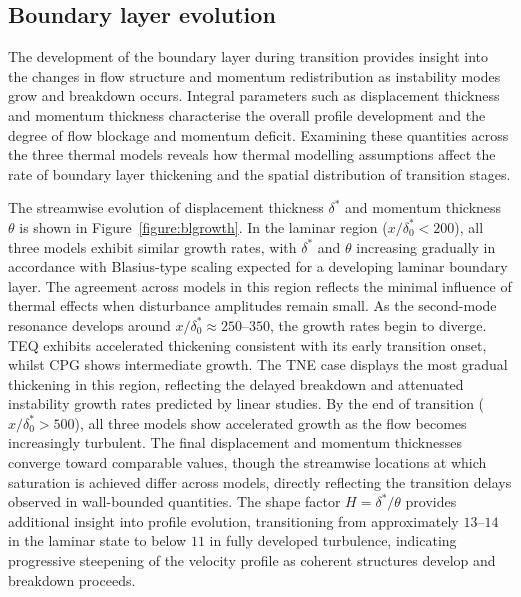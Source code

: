 

\subsection{Boundary layer evolution}

The development of the boundary layer during transition provides insight into the changes in flow structure and momentum redistribution as instability modes grow and breakdown occurs. Integral parameters such as displacement thickness and momentum thickness characterise the overall profile development and the degree of flow blockage and momentum deficit. Examining these quantities across the three thermal models reveals how thermal modelling assumptions affect the rate of boundary layer thickening and the spatial distribution of transition stages.

The streamwise evolution of displacement thickness $\delta^*$ and momentum thickness $\theta$ is shown in Figure~\ref{figure:blgrowth}. In the laminar region ($x/\delta^*_0 < 200$), all three models exhibit similar growth rates, with $\delta^*$ and $\theta$ increasing gradually in accordance with Blasius-type scaling expected for a developing laminar boundary layer. The agreement across models in this region reflects the minimal influence of thermal effects when disturbance amplitudes remain small. As the second-mode resonance develops around $x/\delta^*_0 \approx 250$--$350$, the growth rates begin to diverge. \gls{TEQ} exhibits accelerated thickening consistent with its early transition onset, whilst \gls{CPG} shows intermediate growth. The \gls{TNE} case displays the most gradual thickening in this region, reflecting the delayed breakdown and attenuated instability growth rates predicted by linear studies. By the end of transition ($x/\delta^*_0 > 500$), all three models show accelerated growth as the flow becomes increasingly turbulent. The final displacement and momentum thicknesses converge toward comparable values, though the streamwise locations at which saturation is achieved differ across models, directly reflecting the transition delays observed in wall-bounded quantities. The shape factor $H = \delta^* / \theta$ provides additional insight into profile evolution, transitioning from approximately $13$--$14$ in the laminar state to below $11$ in fully developed turbulence, indicating progressive steepening of the velocity profile as coherent structures develop and breakdown proceeds.

